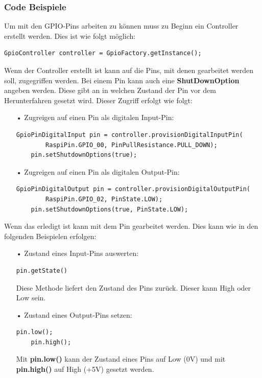\subsubsection{Code Beispiele}
Um mit den GPIO-Pins arbeiten zu können muss zu Beginn ein Controller erstellt werden. Dies ist wie folgt möglich:
\begin{lstlisting}[style=JavaStyle, caption=GPIO-Controller erstellen]
	GpioController controller = GpioFactory.getInstance();
\end{lstlisting}
Wenn der Controller erstellt ist kann auf die Pins, mit denen gearbeitet werden soll, zugegriffen werden. Bei einem Pin kann auch eine \textbf{ShutDownOption} angeben werden. Diese gibt an in welchen Zustand der Pin vor dem Herunterfahren gesetzt wird. Dieser Zugriff erfolgt wie folgt: 
\begin{itemize}
\item[•] Zugreigen auf einen Pin als digitalen Input-Pin:
\begin{lstlisting}[style=JavaStyle, caption=Zugriff auf einen Pin als Inpput]
	GpioPinDigitalInput pin = controller.provisionDigitalInputPin(
		RaspiPin.GPIO_00, PinPullResistance.PULL_DOWN);
	pin.setShutdownOptions(true);
\end{lstlisting}
\item[•] Zugreigen auf einen Pin als digitalen Output-Pin:
\begin{lstlisting}[style=JavaStyle, caption=Zugriff auf einen Pin als Output]
	GpioPinDigitalOutput pin = controller.provisionDigitalOutputPin(
		RaspiPin.GPIO_02, PinState.LOW);
	pin.setShutdownOptions(true, PinState.LOW);
\end{lstlisting}
\end{itemize}
Wenn das erledigt ist kann mit dem Pin gearbeitet werden. Dies kann wie in den folgenden Beispielen erfolgen:
\begin{itemize}
\item[•] Zustand eines Input-Pins auswerten: 
\begin{lstlisting}[style=JavaStyle, caption=Pinzustand abfragen]
	pin.getState()
\end{lstlisting}
Diese Methode liefert den Zustand des Pins zurück. Dieser kann High oder Low sein.
\item[•] Zustand eines Output-Pins setzen:
\begin{lstlisting}[style=JavaStyle, caption=Pinzustand verändern]
	pin.low();	
	pin.high();
\end{lstlisting}
Mit \textbf{pin.low()} kann der Zustand eines Pins auf Low (0V) und mit \textbf{pin.high()} auf High (+5V) gesetzt werden. 
\end{itemize}

